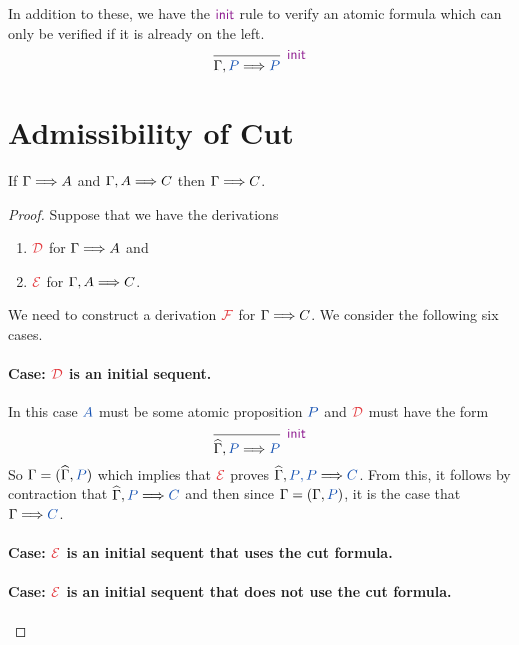In addition to these, we have the $\initRule$ rule to verify an atomic formula
which can only be verified if it is already on the left.
\[
  \begin{prooftree}
    \infer0[$\initRule$]{\sequent[\prp{P}]{\prp{P}}}
  \end{prooftree}
\]

\section{Admissibility of Cut}

\begin{theorem}[Cut]
  If $\sequent{A}$ and $\sequent[A]{C}$ then $\sequent{C}$.
\end{theorem}
\begin{proof}
  Suppose that we have the derivations
  \begin{enumerate}
    \item $\prf{D}$ for $\sequent{A}$ and
    \item $\prf{E}$ for $\sequent[A]{C}$.
  \end{enumerate}
  We need to construct a derivation $\prf{F}$ for $\sequent{}{C}$.
  We consider the following six cases.

  \paragraph{Case: $\prf{D}$ is an initial sequent.} In this case
  $\prp{A}$ must be some atomic proposition $\prp{P}$ and $\prf{D}$
  must have the form
  \[
      \begin{prooftree}
        \infer0[$\initRule$]{\sequentHat[P]{P}}
      \end{prooftree}
  \]
  So $\Gamma = (\widehat{\Gamma}, \prp{P})$ which implies that $\prf{E}$ proves
  $\sequentHat[\prp{P}, \prp{P}]{C}$. From this, it follows by contraction
  that $\sequentHat[\prp{P}]{C}$ and then since $\Gamma = (\Gamma, \prp{P})$,
  it is the case that $\sequent{\prp{C}}$.

  \paragraph{Case: $\prf{E}$ is an initial sequent that uses the cut formula.}
  \quad

  \paragraph{Case: $\prf{E}$ is an initial sequent that does not use the cut
  formula.}\quad{}


\end{proof}

